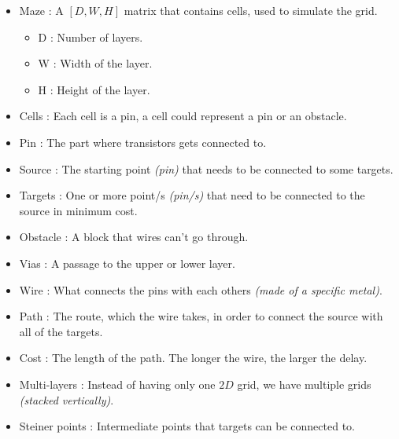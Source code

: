 \begin{itemize}
	\item Maze : A $[D,W,H]$ matrix that contains cells, used to simulate the grid.
	\begin{itemize}
	    \item D : Number of layers.
	    \item W : Width of the layer.
	    \item H : Height of the layer.
	\end{itemize}
    \item Cells : Each cell is a pin, a cell could represent a pin or an obstacle.
	\item Pin : The part where transistors gets connected to.
	\item Source : The starting point \emph{(pin)} that needs to be connected to some targets.
	\item Targets : One or more point/s \emph{(pin/s)} that need to be connected to the source in minimum cost.
	\item Obstacle : A block that wires can't go through.
	\item Vias : A passage to the upper or lower layer.
	\item Wire : What connects the pins with each others \emph{(made of a specific metal)}.
	\item Path : The route, which the wire takes, in order to connect the source with all of the targets.
	\item Cost : The length of the path. The longer the wire, the larger the delay.
	\item Multi-layers : Instead of having only one $2D$ grid, we have multiple grids \emph{(stacked vertically)}.
	\item Steiner points : Intermediate points that targets can be connected to.
\end{itemize}
